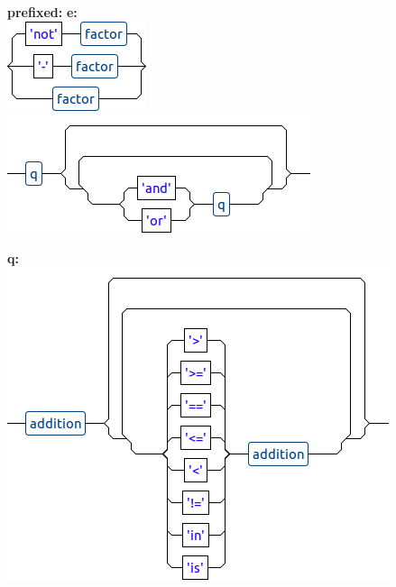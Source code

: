 \begin{figure}[!ht]
\textbf{prefixed:} \hspace{6.5cm} \textbf{e:}\\
\vspace{0.2cm}
\hspace{1cm}\includegraphics[scale=0.37]{./annex/images/prefixed.png} \hspace{5cm}\includegraphics[scale=0.37]{./annex/images/e.png}

\textbf{q:}\\
\vspace{0.2cm}
\hspace{1cm}\includegraphics[scale=0.37]{./annex/images/q.png}


\end{figure}

